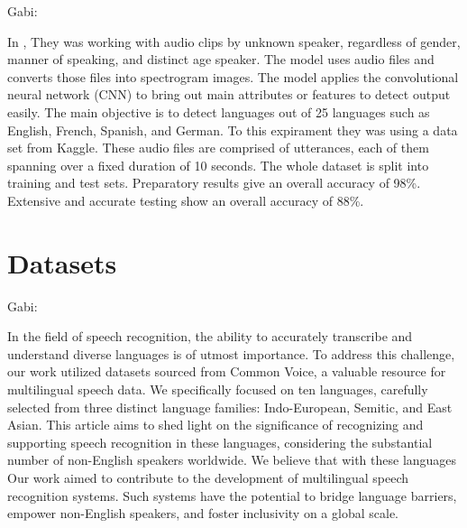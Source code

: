 \documentclass[a4paper]{article}
\begin{document}
Gabi:

In \cite{Gundeep2021Spoken}, They was working with audio clips by unknown speaker, regardless of gender, manner of speaking, and distinct age speaker. The model uses audio files and converts those files into spectrogram images. The model applies the convolutional neural network (CNN) to bring out main attributes or features to detect output easily. The main objective is to detect languages out of 25 languages such as English, French, Spanish, and German. To this expirament they was using a data set from Kaggle. These audio files are comprised of utterances, each of them spanning over a fixed duration of 10 seconds. The whole dataset is split into training and test sets. Preparatory results give an overall accuracy of 98\%. Extensive and accurate testing show an overall accuracy of 88\%.

\section{Datasets}





Gabi:

In the field of speech recognition, the ability to accurately transcribe and understand diverse languages is of utmost importance. To address this challenge, our work utilized datasets sourced from Common Voice, a valuable resource for multilingual speech data. We specifically focused on ten languages, carefully selected from three distinct language families: Indo-European, Semitic, and East Asian. This article aims to shed light on the significance of recognizing and supporting speech recognition in these languages, considering the substantial number of non-English speakers worldwide. We believe that with these languages Our work aimed to contribute to the development of multilingual speech recognition systems. Such systems have the potential to bridge language barriers, empower non-English speakers, and foster inclusivity on a global scale.\newline
\end{document}
